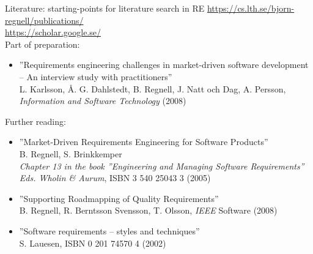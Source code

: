 \documentclass{beamer}
\begin{document}
\begin{frame}[fragile]{Literature: starting-points for literature search in RE}
\footnotesize
\url{https://cs.lth.se/bjorn-regnell/publications/}\\
\url{https://scholar.google.se/}\\
\vfill
Part of preparation:
\begin{itemize}\footnotesize
  \item ''Requirements engineering challenges in market-driven
  software development -- An interview study with practitioners'' \\ L. Karlsson, Å. G. Dahlstedt, B. Regnell, J. Natt och Dag, A. Persson, \emph{Information and Software Technology} (2008) 
\end{itemize}

  Further reading: 
\begin{itemize}\footnotesize
  \item ''Market-Driven Requirements Engineering for Software Products'' \\ B. Regnell, S. Brinkkemper \\ \emph{Chapter 13 in the book ''Engineering and Managing Software Requirements'' Eds. Wholin \& Aurum},  ISBN 3 540 25043 3 (2005)
  \item ''Supporting Roadmapping of Quality Requirements'' \\ B. Regnell, R. Berntsson Svensson, T. Olsson, \emph{IEEE} Software (2008) 
  \item ''Software requirements -- styles and techniques'' \\ S. Lauesen, ISBN 0 201 74570 4  (2002) 
\end{itemize}

\end{frame}
\end{document}
